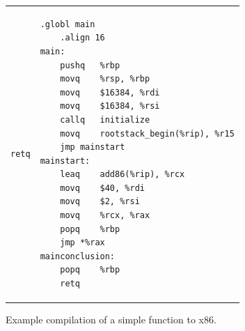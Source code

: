 \documentclass[11pt]{book}
\begin{document}
\begin{figure}[htbp]
\begin{tabular}{ll}
\begin{minipage}{0.3\textwidth}
\begin{lstlisting}[basicstyle=\ttfamily\scriptsize]
	retq
\end{lstlisting}
\end{minipage}
&
\begin{minipage}{0.5\textwidth}
\begin{lstlisting}[basicstyle=\ttfamily\scriptsize]
	.globl main
	.align 16
main:
	pushq	%rbp
	movq	%rsp, %rbp
	movq	$16384, %rdi
	movq	$16384, %rsi
	callq	initialize
	movq	rootstack_begin(%rip), %r15
	jmp	mainstart
mainstart:
	leaq	add86(%rip), %rcx
	movq	$40, %rdi
	movq	$2, %rsi
	movq	%rcx, %rax
	popq	%rbp
	jmp	*%rax
mainconclusion:
	popq	%rbp
	retq
\end{lstlisting}
\end{minipage}
\end{tabular}
\caption{Example compilation of a simple function to x86.}
\label{fig:add-fun}
\end{figure}
\end{document}
